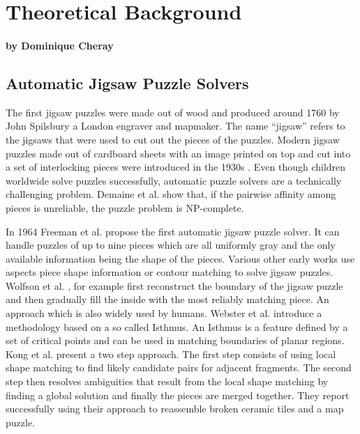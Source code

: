 \documentclass[11pt]{report}
\begin{document}
\chapter{Theoretical Background}
\subsubsection*{by Dominique Cheray}
\section{Automatic Jigsaw Puzzle Solvers}
The first jigsaw puzzles were made out of wood and produced around 1760 by John
Spilsbury a London engraver and mapmaker. The name ``jigsaw'' refers to the
jigsaws that were used to cut out the pieces of the puzzles. Modern jigsaw
puzzles made out of cardboard sheets with an image printed on top and cut into a
set of interlocking pieces were introduced in the 1930s
\cite{williams2004jigsaw}. Even though children worldwide solve puzzles
successfully, automatic puzzle solvers are a technically challenging problem.
Demaine et al. \cite{demaine2007jigsaw} show that, if the pairwise affinity
among pieces is unreliable, the puzzle problem is NP-complete.

In 1964 Freeman et al. \cite{freeman1964apictorial} propose the first automatic
jigsaw puzzle solver. It can handle puzzles of up to nine pieces which are all
uniformly gray and the only available information being the shape of the pieces.
Various other early works use aspects piece shape information or contour
matching to solve jigsaw puzzles. Wolfson et al. \cite{wolfson1988solving}, for example first
reconstruct the boundary of the jigsaw puzzle and then gradually fill the inside
with the most reliably matching piece. An approach which is also widely used by
humans. Webster et al. \cite{webster1990computer} introduce a methodology
based on a so called Isthmus. An Isthmus is a feature defined by a set of
critical points and can be used in matching boundaries of planar regions. Kong
et al. \cite{kong2001solving} present a two step approach. The first step
consists of using local shape matching to find likely candidate pairs for
adjacent fragments. The second step then resolves ambiguities that result from the
local shape matching by finding a global solution and finally the pieces are
merged together. They report successfully using their approach to reassemble
broken ceramic tiles and a map puzzle.
\end{document}
